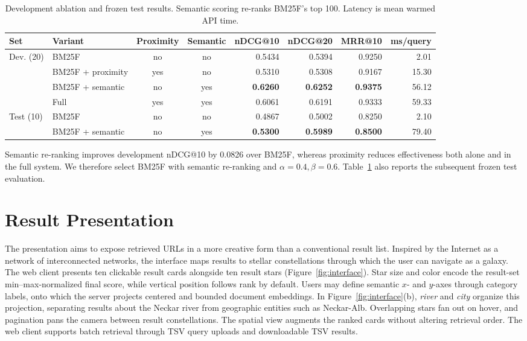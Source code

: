 \documentclass{article}
\begin{document}
\begin{table}[t]
\centering
\caption{Development ablation and frozen test results. Semantic scoring
re-ranks BM25F's top 100. Latency is mean warmed API time.}
\label{tab:retrieval-evaluation}
\small
\setlength{\tabcolsep}{6pt}
\begin{tabular}{@{}llccrrrr@{}}
\toprule
Set & Variant & Proximity & Semantic & nDCG@10 & nDCG@20 & MRR@10 & ms/query \\
\midrule
Dev. (20) & BM25F    & no  & no  & 0.5434 & 0.5394 & 0.9250 &  2.01 \\
 & BM25F + proximity & yes & no  & 0.5310 & 0.5308 & 0.9167 & 15.30 \\
 & BM25F + semantic  & no  & yes & \textbf{0.6260} & \textbf{0.6252} &
  \textbf{0.9375} & 56.12 \\
 & Full              & yes & yes & 0.6061 & 0.6191 & 0.9333 & 59.33 \\
\midrule
Test (10) & BM25F    & no  & no  & 0.4867 & 0.5002 & 0.8250 & 2.10 \\
 & BM25F + semantic  & no  & yes & \textbf{0.5300} & \textbf{0.5989} &
  \textbf{0.8500} & 79.40 \\
\bottomrule
\end{tabular}
\end{table}

Semantic re-ranking improves development nDCG@10 by 0.0826 over BM25F, whereas proximity
reduces effectiveness both alone and in the full system. We therefore select
BM25F with semantic re-ranking and $\alpha=0.4,\beta=0.6$.
Table~\ref{tab:retrieval-evaluation} also reports the subsequent frozen test
evaluation.

\section{Result Presentation}
The presentation aims to expose retrieved URLs in a more creative form than a
conventional result list. Inspired by the Internet as a network of
interconnected networks, the interface maps results to stellar constellations
through which the user can navigate as a galaxy. The web client presents ten
clickable result cards alongside ten result stars
(Figure~\ref{fig:interface}). Star size and color encode the result-set
min--max-normalized final score, while vertical position follows rank by
default. Users may define semantic \(x\)- and \(y\)-axes through category
labels, onto which the server projects centered and bounded document
embeddings. In Figure~\ref{fig:interface}(b), \emph{river} and \emph{city}
organize this projection, separating results about the Neckar river from
geographic entities such as Neckar-Alb. Overlapping stars fan out on hover,
and pagination pans the camera between result constellations. The spatial view
augments the ranked cards without altering retrieval order.
The web client supports batch retrieval through TSV query uploads and
downloadable TSV results.
\end{document}
